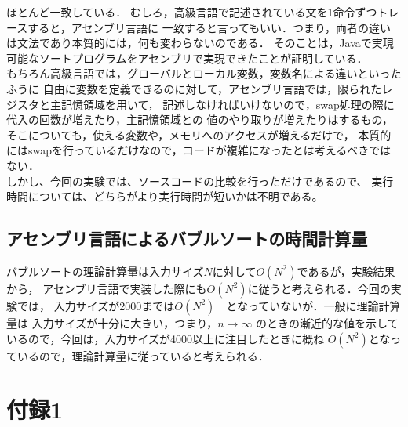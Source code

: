 \documentclass[a4j]{jarticle}
\renewcommand{\lstlistingname}{実行例}
\begin{document}
ほとんど一致している．
むしろ，高級言語で記述されている文を1命令ずつトレースすると，アセンブリ言語に
一致すると言ってもいい．つまり，両者の違いは文法であり本質的には，何も変わらないのである．
そのことは，Javaで実現可能なソートプログラムをアセンブリで実現できたことが証明している．\\
\indent もちろん高級言語では，グローバルとローカル変数，変数名による違いといったふうに
自由に変数を定義できるのに対して，アセンブリ言語では，限られたレジスタと主記憶領域を用いて，
記述しなければいけないので，swap処理の際に代入の回数が増えたり，主記憶領域との
値のやり取りが増えたりはするもの，そこについても，使える変数や，メモリへのアクセスが増えるだけで，
本質的にはswapを行っているだけなので，コードが複雑になったとは考えるべきではない．\\ 
\indent  しかし、今回の実験では、ソースコードの比較を行っただけであるので、
実行時間については、どちらがより実行時間が短いかは不明である。

\subsection{アセンブリ言語によるバブルソートの時間計算量}
バブルソートの理論計算量は入力サイズ$N$に対して$O(N^{2})$であるが，実験結果から，
アセンブリ言語で実装した際にも$O(N^{2})$に従うと考えられる．今回の実験では，
入力サイズが2000までは$O(N^{2})$　となっていないが．一般に理論計算量は
入力サイズが十分に大きい，つまり，$n\rightarrow\infty$
のときの漸近的な値を示しているので，今回は，入力サイズが4000以上に注目したときに概ね
$O(N^{2})$となっているので，理論計算量に従っていると考えられる． 


\newpage
\appendix
\renewcommand{\lstlistingname}{ソースコード}
\setcounter{lstlisting}{0}
\section{付録1}
\end{document}
